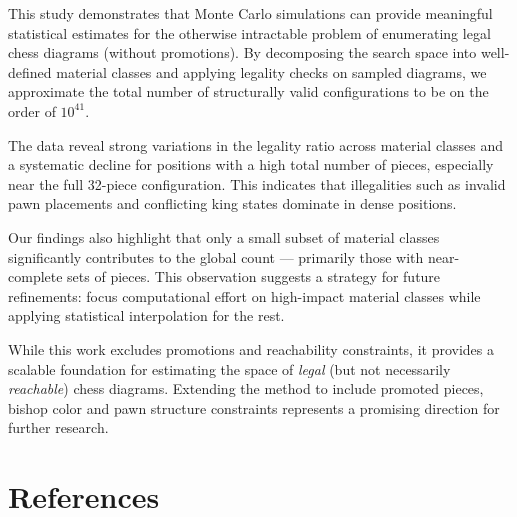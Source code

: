 \documentclass[12pt]{article}
\begin{document}
This study demonstrates that Monte Carlo simulations can provide meaningful statistical estimates for the otherwise intractable problem of enumerating legal chess diagrams (without promotions). By decomposing the search space into well-defined material classes and applying legality checks on sampled diagrams, we approximate the total number of structurally valid configurations to be on the order of $10^{41}$.

The data reveal strong variations in the legality ratio across material classes and a systematic decline for positions with a high total number of pieces, especially near the full 32-piece configuration. This indicates that illegalities such as invalid pawn placements and conflicting king states dominate in dense positions.

Our findings also highlight that only a small subset of material classes significantly contributes to the global count — primarily those with near-complete sets of pieces. This observation suggests a strategy for future refinements: focus computational effort on high-impact material classes while applying statistical interpolation for the rest.

While this work excludes promotions and reachability constraints, it provides a scalable foundation for estimating the space of \emph{legal} (but not necessarily \emph{reachable}) chess diagrams. Extending the method to include promoted pieces, bishop color and pawn structure constraints represents a promising direction for further research.

\section{References}
\end{document}
